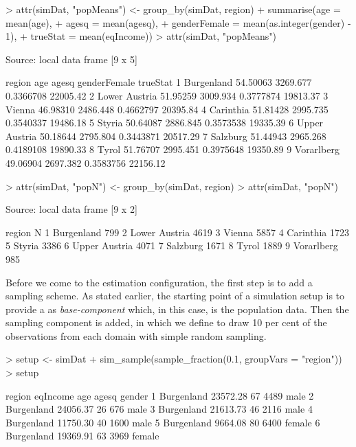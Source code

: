 \documentclass[article]{ajs}
\begin{document}
\begin{Schunk}
\begin{Sinput}
> attr(simDat, "popMeans") <- group_by(simDat, region) %
+   summarise(age = mean(age),
+             agesq = mean(agesq),
+             genderFemale = mean(as.integer(gender) - 1),
+             trueStat = mean(eqIncome))
> attr(simDat, "popMeans")
\end{Sinput}
\begin{Soutput}
Source: local data frame [9 x 5]

         region      age    agesq genderFemale trueStat
1    Burgenland 54.50063 3269.677    0.3366708 22005.42
2 Lower Austria 51.95259 3009.934    0.3777874 19813.37
3        Vienna 46.98310 2486.448    0.4662797 20395.84
4     Carinthia 51.81428 2995.735    0.3540337 19486.18
5        Styria 50.64087 2886.845    0.3573538 19335.39
6 Upper Austria 50.18644 2795.804    0.3443871 20517.29
7      Salzburg 51.44943 2965.268    0.4189108 19890.33
8         Tyrol 51.76707 2995.451    0.3975648 19350.89
9    Vorarlberg 49.06904 2697.382    0.3583756 22156.12
\end{Soutput}
\begin{Sinput}
> attr(simDat, "popN") <- group_by(simDat, region) %
> attr(simDat, "popN")
\end{Sinput}
\begin{Soutput}
Source: local data frame [9 x 2]

         region    N
1    Burgenland  799
2 Lower Austria 4619
3        Vienna 5857
4     Carinthia 1723
5        Styria 3386
6 Upper Austria 4071
7      Salzburg 1671
8         Tyrol 1889
9    Vorarlberg  985
\end{Soutput}
\end{Schunk}

Before we come to the estimation configuration, the first step is to add a sampling scheme. As stated earlier, the starting point of a simulation setup is to provide a  as \textit{base-component} which, in this case, is the population data. Then the sampling component is added, in which we define to draw 10 per cent of the observations from each domain with simple random sampling.

\begin{Schunk}
\begin{Sinput}
> setup <- simDat %
+   sim_sample(sample_fraction(0.1, groupVars = "region"))
> setup
\end{Sinput}
\begin{Soutput}
      region eqIncome age agesq gender
1 Burgenland 23572.28  67  4489   male
2 Burgenland 24056.37  26   676   male
3 Burgenland 21613.73  46  2116   male
4 Burgenland 11750.30  40  1600   male
5 Burgenland  9664.08  80  6400 female
6 Burgenland 19369.91  63  3969 female
\end{Soutput}
\end{Schunk}
\end{document}
